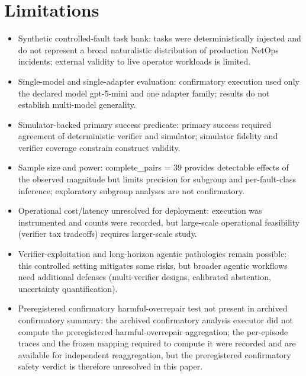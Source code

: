 \documentclass[conference]{IEEEtran}
\begin{document}
\section{Limitations}
\begin{itemize}
\item Synthetic controlled-fault task bank: tasks were deterministically injected and do not represent a broad naturalistic distribution of production NetOps incidents; external validity to live operator workloads is limited.
\item Single-model and single-adapter evaluation: confirmatory execution used only the declared model gpt-5-mini and one adapter family; results do not establish multi-model generality.
\item Simulator-backed primary success predicate: primary success required agreement of deterministic verifier and simulator; simulator fidelity and verifier coverage constrain construct validity.
\item Sample size and power: complete\_pairs = 39 provides detectable effects of the observed magnitude but limits precision for subgroup and per-fault-class inference; exploratory subgroup analyses are not confirmatory.
\item Operational cost/latency unresolved for deployment: execution was instrumented and counts were recorded, but large-scale operational feasibility (verifier tax tradeoffs) requires larger-scale study.
\item Verifier-exploitation and long-horizon agentic pathologies remain possible: this controlled setting mitigates some risks, but broader agentic workflows need additional defenses (multi-verifier designs, calibrated abstention, uncertainty quantification).
\item Preregistered confirmatory harmful-overrepair test not present in archived confirmatory summary: the archived confirmatory analysis executor did not compute the preregistered harmful-overrepair aggregation; the per-episode traces and the frozen mapping required to compute it were recorded and are available for independent reaggregation, but the preregistered confirmatory safety verdict is therefore unresolved in this paper.
\end{itemize}
\end{document}
